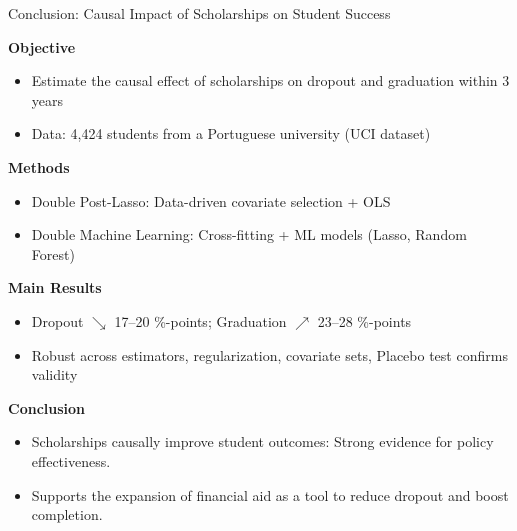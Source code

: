 \documentclass[aspectratio=169]{beamer}
\begin{document}
\begin{frame}{Conclusion: Causal Impact of Scholarships on Student Success}
	
	\textbf{Objective} 
	\vspace{-5pt}
	\begin{itemize}
	\item[\rightarrow]Estimate the causal effect of scholarships on dropout and graduation within 3 years 
	\item[\rightarrow]Data: 4,424 students from a Portuguese university (UCI dataset) 
	\end{itemize}
	\vspace{-5pt}
	
	\textbf{Methods}
	\vspace{-5pt}
	\begin{itemize}
	\item[\rightarrow]Double Post-Lasso: Data-driven covariate selection + OLS
	\item[\rightarrow]Double Machine Learning: Cross-fitting + ML models (Lasso, Random Forest)
	\end{itemize}
	\vspace{-5pt}
	
	\textbf{Main Results}
	\vspace{-5pt}
	\begin{itemize}
	\item[\rightarrow]Dropout $\searrow$ 17–20 \%-points; Graduation $\nearrow$ 23–28 \%-points
	\item[\rightarrow]Robust across estimators, regularization, covariate sets, Placebo test confirms validity
	\end{itemize}
	\vspace{-5pt}

	\textbf{Conclusion}
	\vspace{-5pt}
	\begin{itemize}
	\item[\Rightarrow]Scholarships causally improve student outcomes: Strong evidence for policy effectiveness.
	\item[\Rightarrow]Supports the expansion of financial aid as a tool to reduce dropout and boost completion.
	\end{itemize}
	
\end{frame}
  
\end{document}
